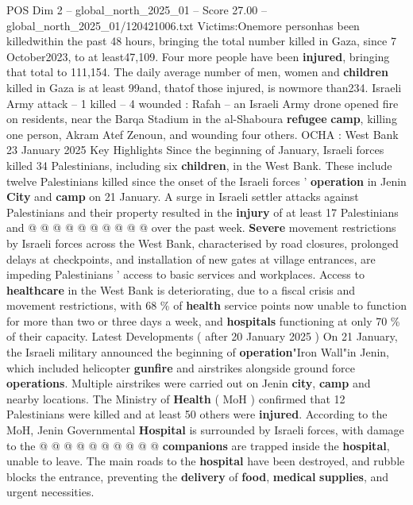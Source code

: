 \begin{textsample}{POS Dim 2 – global\_north\_2025\_01 – Score 27.00 – global\_north\_2025\_01/120421006.txt}  \label{ex:f2_pos_364}
Victims:Onemore personhas been killedwithin the past 48 hours, bringing the total number killed in Gaza, since 7 October2023, to at least47,109.
Four more people have been \textbf{injured}, bringing that total to 111,154.
The daily average number of men, women and \textbf{children} killed in Gaza is at least 99and, thatof those injured, is nowmore than234.
Israeli Army attack -- 1 killed -- 4 wounded : Rafah -- an Israeli Army drone opened fire on residents, near the Barqa Stadium in the al-Shaboura \textbf{refugee} \textbf{camp}, killing one person, Akram Atef Zenoun, and wounding four others.
OCHA : West Bank 23 January 2025 Key Highlights Since the beginning of January, Israeli forces killed 34 Palestinians, including six \textbf{children}, in the West Bank.
These include twelve Palestinians killed since the onset of the Israeli forces ' \textbf{operation} in Jenin \textbf{City} and \textbf{camp} on 21 January.
A surge in Israeli settler attacks against Palestinians and their property resulted in the \textbf{injury} of at least 17 Palestinians and @ @ @ @ @ @ @ @ @ @ over the past week. \textbf{Severe} movement restrictions by Israeli forces across the West Bank, characterised by road closures, prolonged delays at checkpoints, and installation of new gates at village entrances, are impeding Palestinians ' access to basic services and workplaces.
Access to \textbf{healthcare} in the West Bank is deteriorating, due to a fiscal crisis and movement restrictions, with 68 \% of \textbf{health} service points now unable to function for more than two or three days a week, and \textbf{hospitals} functioning at only 70 \% of their capacity.
Latest Developments ( after 20 January 2025 ) On 21 January, the Israeli military announced the beginning of \textbf{operation}"Iron Wall"in Jenin, which included helicopter \textbf{gunfire} and airstrikes alongside ground force \textbf{operations}.
Multiple airstrikes were carried out on Jenin \textbf{city}, \textbf{camp} and nearby locations.
The Ministry of \textbf{Health} ( MoH ) confirmed that 12 Palestinians were killed and at least 50 others were \textbf{injured}.
According to the MoH, Jenin Governmental \textbf{Hospital} is surrounded by Israeli forces, with damage to the @ @ @ @ @ @ @ @ @ @ \textbf{companions} are trapped inside the \textbf{hospital}, unable to leave.
The main roads to the \textbf{hospital} have been destroyed, and rubble blocks the entrance, preventing the \textbf{delivery} of \textbf{food}, \textbf{medical} \textbf{supplies}, and urgent necessities.

\end{textsample}
